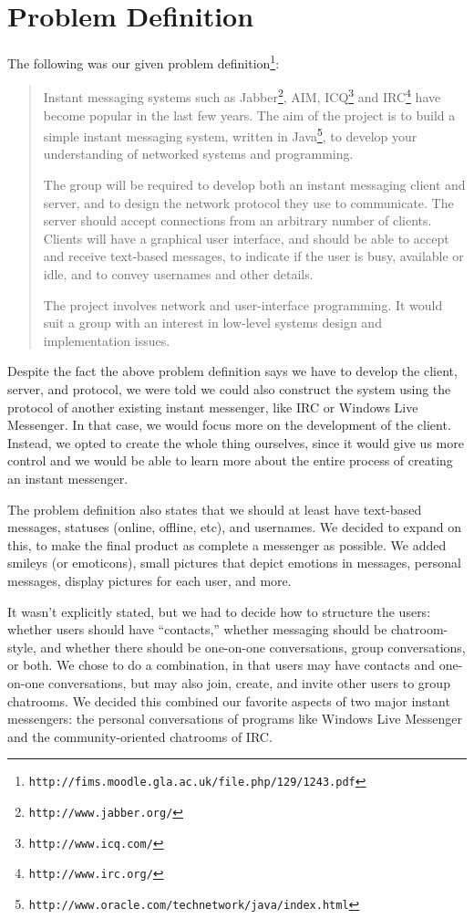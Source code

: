 \section{Problem Definition}
The following was our given problem definition\footnote{\texttt{http://fims.moodle.gla.ac.uk/file.php/129/1243.pdf}}:

\begin{quote}
Instant messaging systems such as Jabber\footnote{\texttt{http://www.jabber.org/}}, AIM, ICQ\footnote{\texttt{http://www.icq.com/}} and IRC\footnote{\texttt{http://www.irc.org/}} have become popular in the last few years. The aim of the project is to build a simple instant messaging system, written in Java\footnote{\texttt{http://www.oracle.com/technetwork/java/index.html}}, to develop your understanding of networked systems and programming.

The group will be required to develop both an instant messaging client and server, and to design the network protocol they use to communicate. The server should accept connections from an arbitrary number of clients. Clients will have a graphical user interface, and should be able to accept and receive text-based messages, to indicate if the user is busy, available or idle, and to convey usernames and other details.

The project involves network and user-interface programming. It would suit a group with an interest in low-level systems design and implementation issues.
\end{quote}

Despite the fact the above problem definition says we have to develop the client, server, and protocol, we were told we could also construct the system using the protocol of another existing instant messenger, like IRC or Windows Live Messenger. In that case, we would focus more on the development of the client. Instead, we opted to create the whole thing ourselves, since it would give us more control and we would be able to learn more about the entire process of creating an instant messenger.

The problem definition also states that we should at least have text-based messages, statuses (online, offline, etc), and usernames. We decided to expand on this, to make the final product as complete a messenger as possible. We added smileys (or emoticons), small pictures that depict emotions in messages, personal messages, display pictures for each user, and more.

It wasn't explicitly stated, but we had to decide how to structure the users: whether users should have ``contacts,'' whether messaging should be chatroom-style, and whether there should be one-on-one conversations, group conversations, or both. We chose to do a combination, in that users may have contacts and one-on-one conversations, but may also join, create, and invite other users to group chatrooms. We decided this combined our favorite aspects of two major instant messengers: the personal conversations of programs like Windows Live Messenger and the community-oriented chatrooms of IRC.

